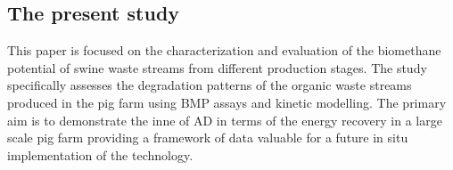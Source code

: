 \subsection{The present study}
This paper is focused on the characterization and evaluation of the biomethane potential of swine waste streams from different production stages. The study specifically assesses the degradation patterns of the organic waste streams produced in the pig farm using BMP assays and kinetic modelling. The primary aim is to demonstrate the inne of AD in terms of the energy recovery in a large scale pig farm providing a framework of data valuable for a future in situ implementation of the technology.